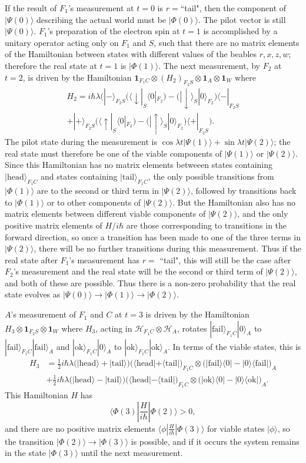 \documentclass[12pt,a4paper,reqno]{article}
\newcommand{\head}{\text{head}}
\newcommand{\tail}{\text{tail}}
\newcommand{\ok}{\text{ok}}
\newcommand{\fail}{\text{fail}}
\renewcommand{\(}{\left(}
\renewcommand{\)}{\right)}
\renewcommand{\.}{\centerdot}
\newcommand{\1}{\mathbf{1}}
\renewcommand{\H}{\mathcal{H}}
\newcommand{\ox}{\otimes}
\newcommand{\<}{\langle}
\renewcommand{\>}{\rangle}
\newcommand{\half}{\tfrac{1}{2}}
\theoremstyle{definition}
\theoremstyle{remark}
\numberwithin{equation}{section}
\begin{document}
 If the result of $F_1$'s measurement at $t = 0$ is $r = $``tail", then the component of $|\Psi(0)\>$ describing the actual world must be $|\Phi(0)\>$. 
The pilot vector is still $|\Psi(0)\>$. $F_1$'s preparation of the electron spin at $t=1$ is accomplished by a unitary operator acting only on $F_1$ and $S$, such that there are no matrix elements of the Hamiltonian between states with different values of the beables $r,x,z,w$; therefore the real state at $t=1$ is $|\Phi(1)\>$. The next measurement, by $F_2$ at $t = 2$, is driven by the Hamiltonian $\1_{F_1C}\ox (H_2)_{F_2S}\ox\1_A\ox \1_W$ where
\begin{multline}
H_2 = i\hbar\lambda\Big(|-\>_{F_2S}\big(\<\downarrow|_S\<0|_{F_2}\big) - \big(|\downarrow\>_S|0\>_{F_2}\big)\<-|_{F_2S}\\
 + |+\>_{F_2S}\big(\<\uparrow|_S\<0|_{F_2}\big) - \big(|\uparrow\>_S|0\>_{F_2}\big)\<+|_{F_2S}\Big).
\end{multline}
The pilot state during the measurement is $\cos\lambda t|\Psi(1)\> + \sin\lambda t|\Psi(2)\>$; the real state must therefore be one of the viable components of $|\Psi(1)\>$ or $|\Psi(2)\>$. Since this Hamiltonian has no matrix elements betweeen states containing $|\head\>_{F_1C}$ and states containing $|\tail\>_{F_1C}$, the only possible transitions from $|\Phi(1)\>$ are to the second or third term in $|\Psi(2)\>$, followed by transitions back to $|\Phi(1)\>$ or to other components of $|\Psi(2)\>$. But the Hamiltonian also has no matrix elements between different viable components of $|\Psi(2)\>$, and the only positive matrix elements of $H/i\hbar$ are those corresponding to transitions in the forward direction, so once a transition has been made to one of the three terms in $|\Psi(2)\>$, there will be no further transitions during this measurement. Thus if the real state after $F_1$'s measurement has $r = $ ``tail", this will still be the case after $F_2$'s measurement and the real state will be the second or third term of $|\Psi(2)\>$, and both of these are possible. Thus there is a non-zero probability that the real state evolves as $|\Psi(0)\> \rightarrow |\Phi(1)\> \rightarrow |\Phi(2)\>$. 

$A$'s measurement of $F_1$ and $C$ at $t = 3$ is driven by the Hamiltonian
$H_3\ox\1_{F_2S}\ox\1_W$ where $H_3$, acting in $\H_{F_1C}\ox\H_A$, rotates $|\fail\>_{F_1C}|0\>_A$ to $|\fail\>_{F_1C}|\fail\>_A$ and $|\ok\>_{F_1C}|0\>_A$ to $|\ok\>_{F_1C}|\ok\>_A$. In terms of the viable states, this is 
\begin{align*}
H_3 &= \half i\hbar\lambda\big(|\head\> + |\tail\>\big)\big(\<\head| + \<\tail|\big)_{F_1C}\ox\big(|\fail\>\<0| - |0\>\<\fail|\big)_A\\
&+ \half i\hbar\lambda\big(|\head\> - |\tail\>\big)\big(\<\head| - \<\tail|\big)_{F_1C}\ox\big(|\ok\>\<0| - |0\>\<\ok|\big)_A.
\end{align*}
This Hamiltonian $H$ has 
\[
\<\Phi(3)|\frac{H}{i\hbar}|\Phi(2)\> > 0,
\]
and there are no positive matrix elements $\<\phi|\tfrac{H}{i\hbar}|\Phi(3)\>$ for viable states $|\phi\>$, so the transition $|\Phi(2)\> \rightarrow |\Phi(3)\>$ is possible, and if it occurs the system remains in the state $|\Phi(3)\>$ until the next measurement.
 
\end{document}
